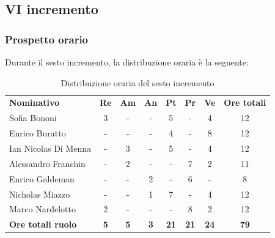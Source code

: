 \documentclass[../piano-di-progetto.tex]{subfiles}
\begin{document}
  \subsection{VI incremento}

  \subsubsection{Prospetto orario}
 Durante il sesto incremento, la distribuzione oraria è la seguente:
  \begin{table}[H]
    \centering
    \begin{tabular}{lccccccc}
    \rowcolor{lightgray}
    \textbf{Nominativo}       & \textbf{Re} & \textbf{Am} & \textbf{An} & \textbf{Pt} & \textbf{Pr} & \textbf{Ve} & \textbf{Ore totali} \\
Sofia Bononi              & 3           & -           & -           & 5           & -           & 4           & 12                  \\
Enrico Buratto            & -           & -           & -           & 4           & -           & 8           & 12                  \\
Ian Nicolas Di Menna      & -           & 3           & -           & 5           & -           & 4           & 12                  \\
Alessandro Franchin       & -           & 2           & -           & -           & 7           & 2           & 11                  \\
Enrico Galdeman           & -           & -           & 2           & -           & 6           & -           & 8                   \\
Nicholas Miazzo           & -           & -           & 1           & 7           & -           & 4           & 12                  \\
Marco Nardelotto          & 2           & -           & -           & -           & 8           & 2           & 12                  \\
\textbf{Ore totali ruolo} & \textbf{5}  & \textbf{5}  & \textbf{3}  & \textbf{21} & \textbf{21} & \textbf{24} & \textbf{79}        
    
    \end{tabular}
    \caption{Distribuzione oraria del sesto incremento}
  \end{table}
\end{document}
